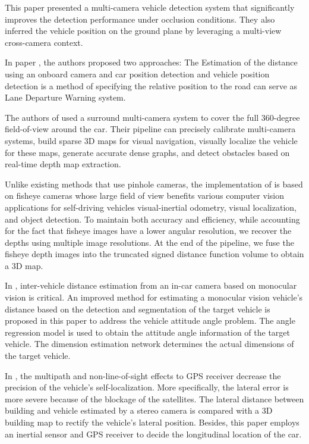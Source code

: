 This paper \cite{Wu2019} presented a multi-camera vehicle detection system that significantly improves the detection performance under occlusion conditions. They also inferred the vehicle position on the ground plane by leveraging a multi-view cross-camera context.

In paper \cite{Ali2016}, the authors proposed two approaches: The  Estimation of the distance using an onboard camera and car position detection and vehicle position detection is a method of specifying the relative position to the road can serve as Lane Departure Warning system. 


The authors of \cite{Hane2017} used a surround multi-camera system to cover the full 360-degree field-of-view around the car. Their pipeline can precisely calibrate multi-camera systems, build sparse 3D maps for visual navigation, visually localize the vehicle for these maps, generate accurate dense graphs, and detect obstacles based on real-time depth map extraction.

Unlike existing methods that use pinhole cameras, the implementation of \cite{Cui2019} is based on fisheye cameras whose large field of view benefits various computer vision applications for self-driving vehicles visual-inertial odometry, visual localization, and object detection. To maintain both accuracy and efficiency, while accounting for the fact that fisheye images have a lower angular resolution, we recover the depths using multiple image resolutions. At the end of the pipeline, we fuse the fisheye depth images into the truncated signed distance function volume to obtain a 3D map.

In \cite{Huang2019}, inter-vehicle distance estimation from an in-car camera based on monocular vision is critical.  An improved method for estimating a monocular vision vehicle's distance based on the detection and segmentation of the target vehicle is proposed in this paper to address the vehicle attitude angle problem. The angle regression model is used to obtain the attitude angle information of the target vehicle. The dimension estimation network determines the actual dimensions of the target vehicle.

In \cite{Bao2016}, the multipath and non-line-of-sight effects to GPS receiver decrease the precision of the vehicle's self-localization. More specifically, the lateral error is more severe because of the blockage of the satellites. The lateral distance between building and vehicle estimated by a stereo camera is compared with a 3D building map to rectify the vehicle's lateral position. Besides, this paper employs an inertial sensor and GPS receiver to decide the longitudinal location of the car.

